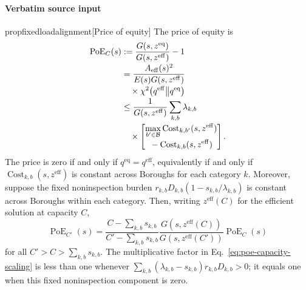 \documentclass[10pt]{article}
\begin{document}
\paragraph{Verbatim source input}
\begin{ReviewVerbatim}
\begin{restatable}{prop}{fixedloadalignment}[Price of equity]
\label{prop:costofequity}
The price of equity is
\begin{align}
\operatorname{PoE}_C(s)
&:=\frac{G(s,z^{\mathrm{eq}})}{G(s,z^{\mathrm{eff}})}-1\notag\\[-2pt]
&=\frac{A_{\mathrm{eff}}(s)^2}{E(s)G(s,z^{\mathrm{eff}})}\notag\\[-2pt]
&\quad\times \chi^2\!\left(q^{\mathrm{eff}}\middle\|q^{\mathrm{eq}}\right)
 \label{eq:price-of-equity-chi-square}\\[-2pt]
&\leq \frac{1}{G(s,z^{\mathrm{eff}})}\sum_{k,b}\lambda_{k,b}\notag\\[-2pt]
&\quad\times\left[
 \begin{gathered}
 \max_{b'\in\mathcal B}\operatorname{Cost}_{k,b'}(s,z^{\mathrm{eff}})\\[-2pt]
 {}-\operatorname{Cost}_{k,b}(s,z^{\mathrm{eff}})
 \end{gathered}\right].\notag
\end{align}
The price is zero if and only if
$q^{\mathrm{eq}}=q^{\mathrm{eff}}$, equivalently if and only if
$\operatorname{Cost}_{k,b}(s,z^{\mathrm{eff}})$ is constant across Boroughs for each  category $k$.  Moreover, suppose the fixed noninspection burden
$r_{k,b}D_{k,b}\left(1-s_{k,b}/\lambda_{k,b}\right)$ is constant across
Boroughs within each category.
Then, writing $z^{\mathrm{eff}}(C)$ for the efficient solution at capacity $C$,
\begin{equation}
\operatorname{PoE}_{C'}(s)
=\frac{C-\sum_{k,b}s_{k,b}}
       {C'-\sum_{k,b}s_{k,b}}
 \frac{G(s,z^{\mathrm{eff}}(C))}{G(s,z^{\mathrm{eff}}(C'))}
 \operatorname{PoE}_{C}(s)
\label{eq:poe-capacity-scaling}
\end{equation}
for all $C'>C>\sum_{k,b}s_{k,b}$.
The multiplicative factor in Eq.~\eqref{eq:poe-capacity-scaling} is less than one whenever
$\sum_{k,b}(\lambda_{k,b}-s_{k,b})r_{k,b}D_{k,b}>0$; it equals one when this fixed noninspection component is zero.
\end{restatable}
\end{ReviewVerbatim}
\end{document}
